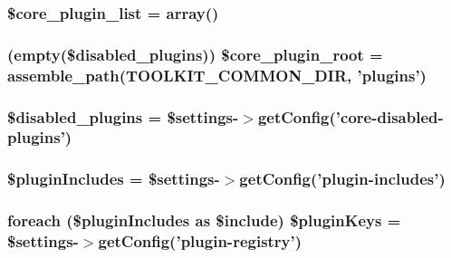 \hypertarget{plugins_8php_a27b356eb1d411e7f7ed1785d15968a45}{
\subsubsection[{\$core\-\_\-plugin\-\_\-list}]{\setlength{\rightskip}{0pt plus 5cm}\$core\-\_\-plugin\-\_\-list = array()}}\label{plugins_8php_a27b356eb1d411e7f7ed1785d15968a45}
\hypertarget{plugins_8php_a852e19bbf55d6c51c0109c5822c885e8}{
\subsubsection[{\$core\-\_\-plugin\-\_\-root}]{ (empty(\$disabled\-\_\-plugins)) \$core\-\_\-plugin\-\_\-root = {\bf assemble\-\_\-path}({\bf T\-O\-O\-L\-K\-I\-T\-\_\-\-C\-O\-M\-M\-O\-N\-\_\-\-D\-I\-R}, 'plugins')}}\label{plugins_8php_a852e19bbf55d6c51c0109c5822c885e8}
\hypertarget{plugins_8php_ab6573c439a183cf07dd2a2a6b8ca873d}{
\subsubsection[{\$disabled\-\_\-plugins}]{\setlength{\rightskip}{0pt plus 5cm}\$disabled\-\_\-plugins = \$settings-\/$>$get\-Config('core-\/disabled-\/plugins')}}\label{plugins_8php_ab6573c439a183cf07dd2a2a6b8ca873d}
\hypertarget{plugins_8php_a122ee7f8aad4a1f7a48008ff12eed8f1}{
\subsubsection[{\$plugin\-Includes}]{\setlength{\rightskip}{0pt plus 5cm}\$plugin\-Includes = \$settings-\/$>$get\-Config('plugin-\/includes')}}\label{plugins_8php_a122ee7f8aad4a1f7a48008ff12eed8f1}
\hypertarget{plugins_8php_a7d093d3181ef48feca688de5ba5578a0}{
\subsubsection[{\$plugin\-Keys}]{\setlength{\rightskip}{0pt plus 5cm}foreach (\$plugin\-Includes as \$include) \$plugin\-Keys = \$settings-\/$>$get\-Config('plugin-\/registry')}}\label{plugins_8php_a7d093d3181ef48feca688de5ba5578a0}

